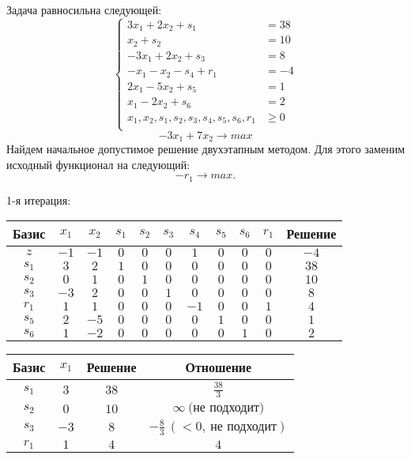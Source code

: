 \documentclass{article}%
\begin{document}
Задача равносильна следующей: %
\[%
\left\{\begin{aligned}3x_{1}+2x_{2}+s_{1} & =38 \\x_{2}+s_{2} & =10 \\-3x_{1}+2x_{2}+s_{3} & =8 \\-x_{1}-x_{2}-s_{4}+r_{1} & =-4 \\2x_{1}-5x_{2}+s_{5} & =1 \\x_{1}-2x_{2}+s_{6} & =2 \\x_{1},x_{2},s_{1},s_{2},s_{3},s_{4},s_{5},s_{6},r_{1} & \ge 0 \\ \end{aligned}\right.%
\]%
\[%
-3x_{1}+7x_{2}  \to max%
\]%
Найдем начальное допустимое решение двухэтапным методом. Для этого заменим исходный функционал на следующий: %
\[%
-r_{1}\to max.%
\]%
\begin{flushleft}%
1{-}я итерация: %
\newline%
\newline%
\renewcommand{\arraystretch}{1.3}%
\begin{tabular}{|c|ccccccccc|c|}%
\hline%
Базис&$x_{1}$&$x_{2}$&$s_{1}$&$s_{2}$&$s_{3}$&$s_{4}$&$s_{5}$&$s_{6}$&$r_{1}$&Решение\\%
\hline%
$z$&$-1$&$-1$&$0$&$0$&$0$&$1$&$0$&$0$&$0$&$-4$\\%
\hline%
$s_{1}$&$3$&$2$&$1$&$0$&$0$&$0$&$0$&$0$&$0$&$38$\\%
$s_{2}$&$0$&$1$&$0$&$1$&$0$&$0$&$0$&$0$&$0$&$10$\\%
$s_{3}$&$-3$&$2$&$0$&$0$&$1$&$0$&$0$&$0$&$0$&$8$\\%
$r_{1}$&$1$&$1$&$0$&$0$&$0$&$-1$&$0$&$0$&$1$&$4$\\%
$s_{5}$&$2$&$-5$&$0$&$0$&$0$&$0$&$1$&$0$&$0$&$1$\\%
$s_{6}$&$1$&$-2$&$0$&$0$&$0$&$0$&$0$&$1$&$0$&$2$\\%
\hline%
\end{tabular}%
\newline%
\newline%
\newline%
\begin{tabular}{|cccc|}%
\hline%
Базис&$x_{1}$&Решение&Отношение\\%
\hline%
$s_{1}$&$3$&$38$&$\frac{38}{3}$\\%
$s_{2}$&$0$&$10$&$\infty \: \text{(не подходит)}$\\%
$s_{3}$&$-3$&$8$&$-\frac{8}{3}\: (< 0, \: \text{не подходит})$\\%
$r_{1}$&$1$&$4$&$4$\\%

\end{tabular}
\end{flushleft}
\end{document}
